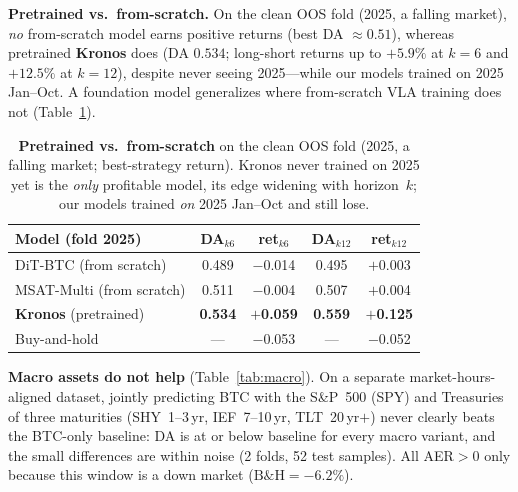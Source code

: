 \documentclass[10pt]{article}
\begin{document}
\noindent\textbf{Pretrained vs.\ from-scratch.} On the clean OOS fold (2025, a falling market),
\emph{no} from-scratch model earns positive returns (best DA ${\approx}0.51$), whereas pretrained
\textbf{Kronos} does (DA $0.534$; long-short returns up to $+5.9\%$ at $k{=}6$ and $+12.5\%$ at
$k{=}12$), despite never seeing 2025---while our models trained on 2025 Jan--Oct. A foundation
model generalizes where from-scratch VLA training does not (Table~\ref{tab:kronos}).

\begin{table}[htbp]
\centering\small
\caption{\textbf{Pretrained vs.\ from-scratch} on the clean OOS fold (2025, a falling market;
best-strategy return). Kronos never trained on 2025 yet is the \emph{only} profitable model, its
edge widening with horizon~$k$; our models trained \emph{on} 2025 Jan--Oct and still lose.}
\label{tab:kronos}
\begin{tabular}{lcccc}
\toprule
Model (fold 2025) & DA$_{k6}$ & ret$_{k6}$ & DA$_{k12}$ & ret$_{k12}$ \\ \midrule
DiT-BTC (from scratch)    & 0.489 & $-$0.014 & 0.495 & $+$0.003 \\
MSAT-Multi (from scratch) & 0.511 & $-$0.004 & 0.507 & $+$0.004 \\
\textbf{Kronos} (pretrained) & \textbf{0.534} & \textbf{$+$0.059} & \textbf{0.559} & \textbf{$+$0.125} \\ \midrule
Buy-and-hold              & --- & $-$0.053 & --- & $-$0.052 \\
\bottomrule
\end{tabular}
\end{table}

\noindent\textbf{Macro assets do not help} (Table~\ref{tab:macro}). On a separate market-hours-
aligned dataset, jointly predicting BTC with the S\&P~500 (SPY) and Treasuries of three maturities
(SHY~1--3\,yr, IEF~7--10\,yr, TLT~20\,yr$+$) never clearly beats the BTC-only baseline: DA is at or
below baseline for every macro variant, and the small differences are within noise (2 folds, 52
test samples). All AER${>}0$ only because this window is a down market ($\text{B\&H}{=}-6.2\%$).
\end{document}
